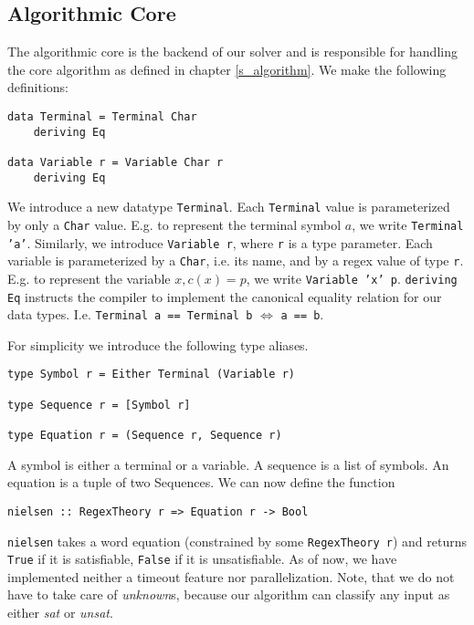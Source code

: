 \subsection{Algorithmic Core} \label{ss_backend}
The algorithmic core is the backend of our solver and is responsible for handling the core algorithm as defined in chapter \ref{s_algorithm}. We make the following definitions:

\begin{verbatim}
data Terminal = Terminal Char
    deriving Eq

data Variable r = Variable Char r
    deriving Eq
\end{verbatim}

We introduce a new datatype \texttt{Terminal}. Each \texttt{Terminal} value is parameterized by only a  \texttt{Char} value. E.g. to represent the terminal symbol $a$, we write \texttt{Terminal 'a'}.
Similarly, we introduce \texttt{Variable r}, where \texttt{r} is a type parameter. Each variable is parameterized by a \texttt{Char}, i.e. its name, and by a regex value of type \texttt{r}. E.g. to represent the variable $x, c(x) = p$, we write \texttt{Variable 'x' p}. \texttt{deriving Eq} instructs the compiler to implement the canonical equality relation for our data types. I.e. \texttt{Terminal a == Terminal b} $\Leftrightarrow$ \texttt{a == b}.

For simplicity we introduce the following type aliases.

\begin{verbatim}
type Symbol r = Either Terminal (Variable r)

type Sequence r = [Symbol r]

type Equation r = (Sequence r, Sequence r)
\end{verbatim}
A symbol is either a terminal or a variable. A sequence is a list of symbols. An equation is a tuple of two Sequences. We can now define the function
\begin{verbatim}
nielsen :: RegexTheory r => Equation r -> Bool
\end{verbatim}

\texttt{nielsen} takes a word equation (constrained by some \texttt{RegexTheory r}) and returns \texttt{True} if it is satisfiable, \texttt{False} if it is unsatisfiable. As of now, we have implemented neither a timeout feature nor parallelization. Note, that we do not have to take care of \textit{unknown}s, because our algorithm can classify any input as either \textit{sat} or \textit{unsat}.

